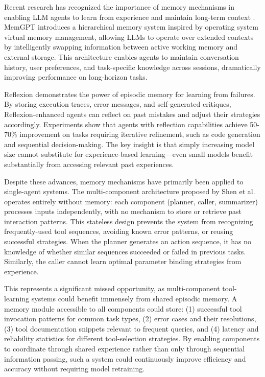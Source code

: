\documentclass[conference]{IEEEtran}
\begin{document}
Recent research has recognized the importance of memory mechanisms in enabling LLM agents to learn from experience and maintain long-term context \cite{park2023memgpt, shinn2024reflexion}. MemGPT \cite{park2023memgpt} introduces a hierarchical memory system inspired by operating system virtual memory management, allowing LLMs to operate over extended contexts by intelligently swapping information between active working memory and external storage. This architecture enables agents to maintain conversation history, user preferences, and task-specific knowledge across sessions, dramatically improving performance on long-horizon tasks.

Reflexion \cite{shinn2024reflexion} demonstrates the power of episodic memory for learning from failures. By storing execution traces, error messages, and self-generated critiques, Reflexion-enhanced agents can reflect on past mistakes and adjust their strategies accordingly. Experiments show that agents with reflection capabilities achieve 50-70\% improvement on tasks requiring iterative refinement, such as code generation and sequential decision-making. The key insight is that simply increasing model size cannot substitute for experience-based learning—even small models benefit substantially from accessing relevant past experiences.

Despite these advances, memory mechanisms have primarily been applied to single-agent systems. The multi-component architecture proposed by Shen et al. \cite{shen2024small} operates entirely without memory: each component (planner, caller, summarizer) processes inputs independently, with no mechanism to store or retrieve past interaction patterns. This stateless design prevents the system from recognizing frequently-used tool sequences, avoiding known error patterns, or reusing successful strategies. When the planner generates an action sequence, it has no knowledge of whether similar sequences succeeded or failed in previous tasks. Similarly, the caller cannot learn optimal parameter binding strategies from experience.

This represents a significant missed opportunity, as multi-component tool-learning systems could benefit immensely from shared episodic memory. A memory module accessible to all components could store: (1) successful tool invocation patterns for common task types, (2) error cases and their resolutions, (3) tool documentation snippets relevant to frequent queries, and (4) latency and reliability statistics for different tool-selection strategies. By enabling components to coordinate through shared experience rather than only through sequential information passing, such a system could continuously improve efficiency and accuracy without requiring model retraining.
\end{document}
